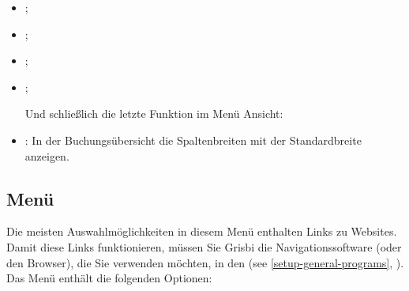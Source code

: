 \begin{itemize}
	\item {};%
	\item {};%
	\item {};%
	\item {};%
	\vspace{2mm}
	\begin{addmargin*}[-10pt]{0cm} 	%
	Und schließlich die letzte Funktion im Menü Ansicht:
	\end{addmargin*}	
	\item {}: In der Buchungsübersicht die Spaltenbreiten mit der Standardbreite anzeigen.
\end{itemize}

\subsection{Menü \label{home-menus-help}}

Die meisten Auswahlmöglichkeiten in diesem Menü enthalten Links zu Websites. Damit diese Links funktionieren, müssen Sie Grisbi die Navigationssoftware (oder den Browser), die Sie verwenden möchten, in den  (see \vref{setup-general-programs}, ). Das Menü  enthält die folgenden Optionen:

